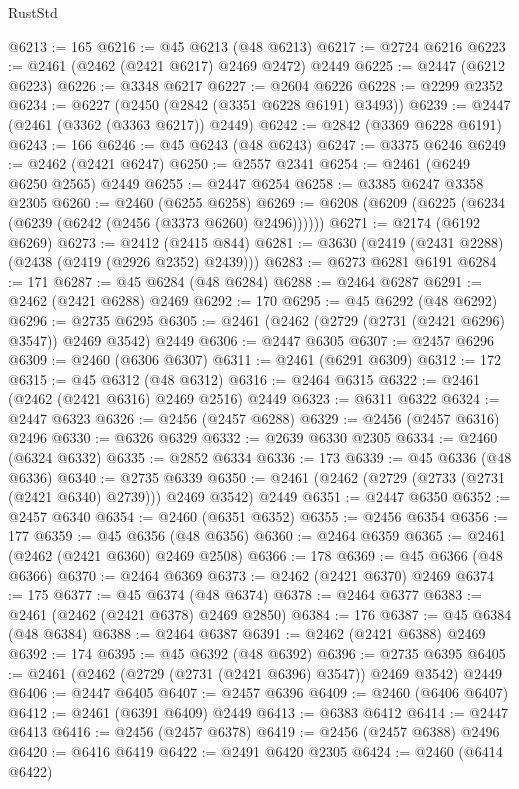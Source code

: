 \begin{lexlean}{RustStd}
\begin{coremodule}
@6213 := 165
@6216 := @45 @6213 (@48 @6213)
@6217 := @2724 @6216
@6223 := @2461 (@2462 (@2421 @6217) @2469 @2472) @2449
@6225 := @2447 (@6212 @6223)
@6226 := @3348 @6217
@6227 := @2604 @6226
@6228 := @2299 @2352
@6234 := @6227 (@2450 (@2842 (@3351 @6228 @6191) @3493))
@6239 := @2447 (@2461 (@3362 (@3363 @6217)) @2449)
@6242 := @2842 (@3369 @6228 @6191)
@6243 := 166
@6246 := @45 @6243 (@48 @6243)
@6247 := @3375 @6246
@6249 := @2462 (@2421 @6247)
@6250 := @2557 @2341
@6254 := @2461 (@6249 @6250 @2565) @2449
@6255 := @2447 @6254
@6258 := @3385 @6247 @3358 @2305
@6260 := @2460 (@6255 @6258)
@6269 := @6208 (@6209 (@6225 (@6234 (@6239 (@6242 (@2456 (@3373 @6260) @2496))))))
@6271 := @2174 (@6192 @6269)
@6273 := @2412 (@2415 @844)
@6281 := @3630 (@2419 (@2431 @2288) (@2438 (@2419 (@2926 @2352) @2439)))
@6283 := @6273 @6281 @6191
@6284 := 171
@6287 := @45 @6284 (@48 @6284)
@6288 := @2464 @6287
@6291 := @2462 (@2421 @6288) @2469
@6292 := 170
@6295 := @45 @6292 (@48 @6292)
@6296 := @2735 @6295
@6305 := @2461 (@2462 (@2729 (@2731 (@2421 @6296) @3547)) @2469 @3542) @2449
@6306 := @2447 @6305
@6307 := @2457 @6296
@6309 := @2460 (@6306 @6307)
@6311 := @2461 (@6291 @6309)
@6312 := 172
@6315 := @45 @6312 (@48 @6312)
@6316 := @2464 @6315
@6322 := @2461 (@2462 (@2421 @6316) @2469 @2516) @2449
@6323 := @6311 @6322
@6324 := @2447 @6323
@6326 := @2456 (@2457 @6288)
@6329 := @2456 (@2457 @6316) @2496
@6330 := @6326 @6329
@6332 := @2639 @6330 @2305
@6334 := @2460 (@6324 @6332)
@6335 := @2852 @6334
@6336 := 173
@6339 := @45 @6336 (@48 @6336)
@6340 := @2735 @6339
@6350 := @2461 (@2462 (@2729 (@2733 (@2731 (@2421 @6340) @2739))) @2469 @3542) @2449
@6351 := @2447 @6350
@6352 := @2457 @6340
@6354 := @2460 (@6351 @6352)
@6355 := @2456 @6354
@6356 := 177
@6359 := @45 @6356 (@48 @6356)
@6360 := @2464 @6359
@6365 := @2461 (@2462 (@2421 @6360) @2469 @2508)
@6366 := 178
@6369 := @45 @6366 (@48 @6366)
@6370 := @2464 @6369
@6373 := @2462 (@2421 @6370) @2469
@6374 := 175
@6377 := @45 @6374 (@48 @6374)
@6378 := @2464 @6377
@6383 := @2461 (@2462 (@2421 @6378) @2469 @2850)
@6384 := 176
@6387 := @45 @6384 (@48 @6384)
@6388 := @2464 @6387
@6391 := @2462 (@2421 @6388) @2469
@6392 := 174
@6395 := @45 @6392 (@48 @6392)
@6396 := @2735 @6395
@6405 := @2461 (@2462 (@2729 (@2731 (@2421 @6396) @3547)) @2469 @3542) @2449
@6406 := @2447 @6405
@6407 := @2457 @6396
@6409 := @2460 (@6406 @6407)
@6412 := @2461 (@6391 @6409) @2449
@6413 := @6383 @6412
@6414 := @2447 @6413
@6416 := @2456 (@2457 @6378)
@6419 := @2456 (@2457 @6388) @2496
@6420 := @6416 @6419
@6422 := @2491 @6420 @2305
@6424 := @2460 (@6414 @6422)

\end{coremodule}
\end{lexlean}
